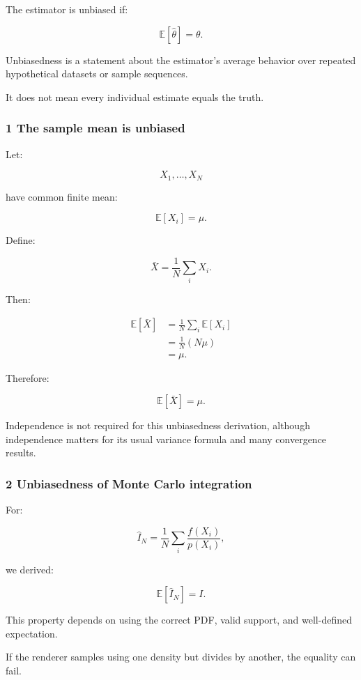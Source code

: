 The estimator is unbiased if:

\[
 \boxed{ \mathbb E[\widehat\theta]=\theta }.
\]

Unbiasedness is a statement about the estimator's average behavior over repeated hypothetical datasets or sample sequences.

It does not mean every individual estimate equals the truth.

\subsubsection{1 The sample mean is unbiased}\label{02-foundations-ii-ch030-the-sample-mean-is-unbiased}

Let:

\[
 X_1,\ldots,X_N
\]

have common finite mean:

\[
 \mathbb E[X_i]=\mu.
\]

Define:

\[
 \bar X=\frac1N\sum_iX_i.
\]

Then:

\[
 \begin{aligned} \mathbb E[\bar X] &=\frac1N\sum_i\mathbb E[X_i]\\ &=\frac1N(N\mu)\\ &=\mu. \end{aligned}
\]

Therefore:

\[
 \boxed{\mathbb E[\bar X]=\mu}.
\]

Independence is not required for this unbiasedness derivation, although independence matters for its usual variance formula and many convergence results.

\subsubsection{2 Unbiasedness of Monte Carlo integration}\label{02-foundations-ii-ch030-unbiasedness-of-monte-carlo-integration}

For:

\[
 \widehat I_N= \frac1N\sum_i\frac{f(X_i)}{p(X_i)},
\]

we derived:

\[
 \mathbb E[\widehat I_N]=I.
\]

This property depends on using the correct PDF, valid support, and well-defined expectation.

If the renderer samples using one density but divides by another, the equality can fail.

